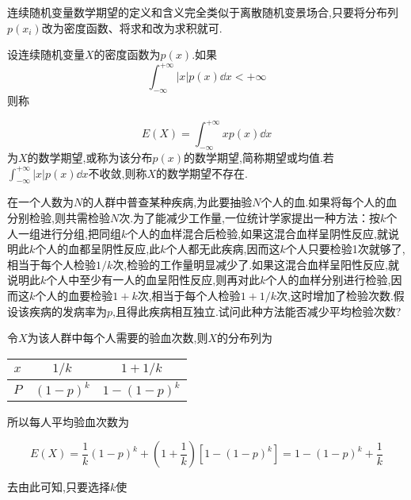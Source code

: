 连续随机变量数学期望的定义和含义完全类似于离散随机变景场合,只要将分布列$ p(x_i) $改为密度函数、将求和改为求积就可.

\begin{definition}{}{}
	设连续随机变量$ X $的密度函数为$ p(x) $.如果
	\[
	\int_{-\infty}^{+\infty}|x| p(x) \dd  x<+\infty
	\]
	则称
	
	\begin{equation}
	E(X)=\int_{-\infty}^{+\infty} x p(x) \dd  x \label{eq:2.2.2}
	\end{equation}
	为$ X $的数学期望,或称为该分布$ p(x) $的数学期望,简称期望或均值.若$\int_{-\infty}^{+\infty}|x| p(x) \dd  x$不收敛,则称$ X $的数学期望不存在.
	
\end{definition}

\begin{example}
	在一个人数为$ N $的人群中普查某种疾病,为此要抽验$ N $个人的血.如果将每个人的血分别检验,则共需检验$ N $次.为了能减少工作量,一位统计学家提出一种方法：按$ k $个人一组进行分组,把同组$ k $个人的血样混合后检验,如果这混合血样呈阴性反应,就说明此$ k $个人的血都呈阴性反应,此$ k $个人都无此疾病,因而这$ k $个人只要检验1次就够了,相当于每个人检验$ 1/k $次,检验的工作量明显减少了.如果这混合血样呈阳性反应,就说明此$ k $个人中至少有一人的血呈阳性反应,则再对此$ k $个人的血样分别进行检验,因而这$ k $个人的血要检验$ 1+k $次,相当于每个人检验$ 1+1/k $次,这时增加了检验次数.假设该疾病的发病率为$ p $,且得此疾病相互独立.试问此种方法能否减少平均检验次数?
\end{example}
	
	\begin{solution}
	
	令$ X $为该人群中每个人需要的验血次数,则$ X $的分布列为
	
	\begin{table}[htbp]
		\centering
		\begin{tabular}{c|cc}
			$ x $	&    $ 1 / k $      &  $ 1+1 / k $ \\\midrule
			$ P $	&    $ (1-p)^{k} $  &  $ 1-(1-p)^{k} $\\
		\end{tabular}%
	\end{table}%
	
\end{solution}

所以每人平均验血次数为

\[
E(X)=\frac{1}{k}(1-p)^{k}+\left(1+\frac{1}{k}\right)\left[1-(1-p)^{k}\right]=1-(1-p)^{k}+\frac{1}{k}
\]

去由此可知,只要选择$ k $使

